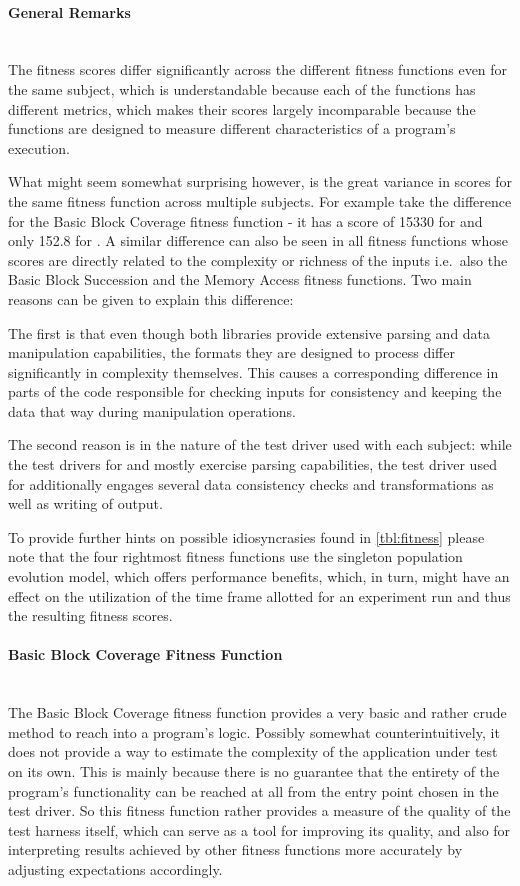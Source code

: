 \paragraph{General Remarks} ~\\
The fitness scores differ significantly across the different fitness functions even for the same subject,
which is understandable because each of the functions has different metrics, which makes their scores
largely incomparable because the functions are designed to measure different characteristics of a
program's execution.

What might seem somewhat surprising however, is the great variance in scores for the same fitness function
across multiple subjects. For example take the difference for the Basic Block Coverage fitness function - it
has a score of 15330 for \libpng and only 152.8 for \libpcap. 
A similar difference can also be seen in all fitness functions whose scores are directly related to the
complexity or richness of the inputs i.e.\ also the Basic Block Succession and the Memory Access fitness
functions. Two main reasons can be given to explain this difference:

The first is that even though both libraries provide extensive parsing and data manipulation capabilities,
the formats they are designed to process differ significantly in complexity themselves. This causes a
corresponding difference in parts of the code responsible for checking inputs for consistency and keeping
the data that way during manipulation operations.

The second reason is in the nature of the test driver used with each subject: while the test drivers for
\libpcap and \libxml mostly exercise parsing capabilities, the test driver used for \libpng additionally
engages several data consistency checks and transformations as well as writing of output.

To provide further hints on possible idiosyncrasies found in \cref{tbl:fitness} please note that the four
rightmost fitness functions use the singleton population evolution model, which offers performance benefits,
which, in turn, might have an effect on the utilization of the time frame allotted for an experiment run and
thus the resulting fitness scores.

\paragraph{Basic Block Coverage Fitness Function} ~\\
The Basic Block Coverage fitness function provides a very basic and rather crude method to reach into a
program's logic. Possibly somewhat counterintuitively, it does not provide a way to estimate the complexity of
the application under test on its own. This is mainly because there is no guarantee that the entirety of
the program's functionality can be reached at all from the entry point chosen in the test driver. So this fitness function
rather provides a measure of the quality of the test harness itself, which can serve as a tool for improving
its quality, and also for interpreting results achieved by other fitness functions more accurately by adjusting
expectations accordingly.

